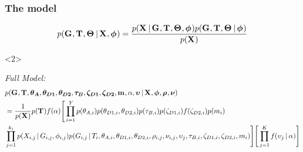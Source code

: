 \begin{frame}[t]
    \frametitle{The \msb model}
    \begin{displaybox}[8.5cm]
    \[
        p(\geneTreeVector, \divTimeMapVector, \demographicParamVector
        \given
        \alignmentVector, \hkyModelVector) =
        \frac{p(\alignmentVector \given \geneTreeVector, \divTimeMapVector,
        \demographicParamVector, \hkyModelVector)
        p(\geneTreeVector, \divTimeMapVector, \demographicParamVector \given \hkyModelVector)}{
        p(\alignmentVector)}
    \]\vspace{0mm}
    \end{displaybox}
    \smallskip
    \begin{onlyenv}<2>
    \begin{block}{\it Full Model:}
    {\tiny
    \begin{equation*}
        \begin{split}
        & p(\geneTreeVector,
        \divTimeMapVector,
        \ancestralThetaVector,
        \descendantThetaVector{1}, \descendantThetaVector{2},
        \bottleTimeVector, \bottleScalarVector{1},
        \bottleScalarVector{2},
        \migrationRateVector,
        \locusRateHetShapeParameter,
        \locusMutationRateScalarVector \given
        \alignmentVector, \hkyModelVector, \ploidyScalarVector,
        \mutationRateScalarConstantVector) \\
        & = \frac{1}{p(\alignmentVector)}
        p(\divTimeMapVector)
        f(\locusRateHetShapeParameter)
        \Bigg[
        \prod_{i=1}^{\npairs{}}
        p(\ancestralTheta{i})
        p(\descendantTheta{1}{i}, \descendantTheta{2}{i})
        p(\bottleTime{i})
        p(\bottleScalar{1}{i}) f(\bottleScalar{2}{i})
        p(\migrationRate{i}) \\
        &
        \prod_{j=1}^{\nloci{i}}
        p(\alignment{i}{j} \given
        \geneTree{i}{j}, \hkyModel{i}{j})
        p(\geneTree{i}{j} \given
        \divTimeMap{i},
        \ancestralTheta{i}, \descendantTheta{1}{i}, \descendantTheta{2}{i},
        \ploidyScalar{i}{j}, \mutationRateScalarConstant{i}{j},
        \locusMutationRateScalar{j},
        \bottleTime{i}, \bottleScalar{1}{i}, \bottleScalar{2}{i},
        \migrationRate{i})
        \Bigg]
        \Bigg[
        \prod_{j=1}^{\nlociTotal}
        f(\locusMutationRateScalar{j} \given \locusRateHetShapeParameter)
        \Bigg]
        \label{eq:fullmodel}
        \end{split}
    \end{equation*}
    }

\end{block}
\end{onlyenv}
\end{frame}
